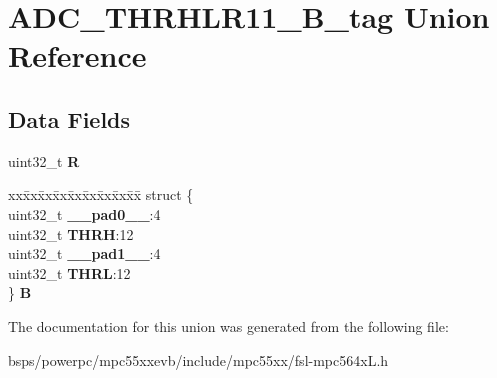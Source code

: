 \hypertarget{unionADC__THRHLR11__32B__tag}{}\section{A\+D\+C\+\_\+\+T\+H\+R\+H\+L\+R11\+\_\+B\+\_\+tag Union Reference}
\label{unionADC__THRHLR11__32B__tag}
\subsection*{Data Fields}
\begin{DoxyCompactItemize}
\item 
\mbox{\label{unionADC__THRHLR11__32B__tag_a9906bb360c6c17fa72453031fa80140b}} 
uint32\+\_\+t {\bfseries R}
\item 
\mbox{\label{unionADC__THRHLR11__32B__tag_a69e45c6319c16a40c6ce9dd88185dbe8}} 
\begin{tabbing}
xx\=xx\=xx\=xx\=xx\=xx\=xx\=xx\=xx\=\kill
struct \{\\
\>uint32\_t {\bfseries \_\_pad0\_\_}:4\\
\>uint32\_t {\bfseries THRH}:12\\
\>uint32\_t {\bfseries \_\_pad1\_\_}:4\\
\>uint32\_t {\bfseries THRL}:12\\
\} {\bfseries B}\\

\end{tabbing}\end{DoxyCompactItemize}


The documentation for this union was generated from the following file\+:\begin{DoxyCompactItemize}
\item 
bsps/powerpc/mpc55xxevb/include/mpc55xx/fsl-\/mpc564x\+L.\+h\end{DoxyCompactItemize}

